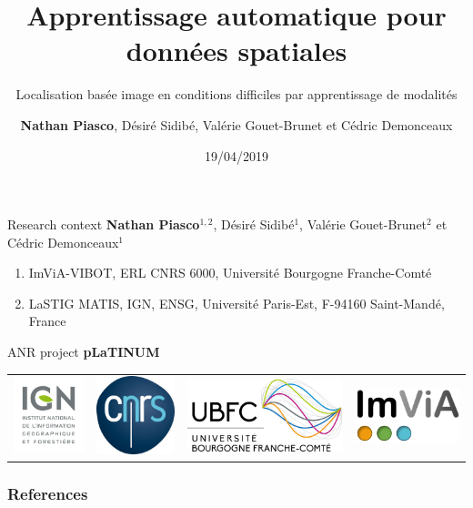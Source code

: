 \documentclass[9pt]{beamer}
\title{Apprentissage automatique pour données spatiales}
\subtitle{Localisation basée image en conditions difficiles par apprentissage de modalités}
\author{\textbf{Nathan Piasco}, Désiré Sidibé, Valérie Gouet-Brunet et Cédric Demonceaux}
\institute{$28^{iemes}$ Journées de la Recherche} %
\date{19/04/2019}
\begin{document}
\begin{frame}[plain,c]
	\titlepage
\end{frame}

\begin{frame}{Research context}
	\textbf{Nathan Piasco}$^{1, 2}$, Désiré Sidibé$^1$, Valérie Gouet-Brunet$^2$ et Cédric Demonceaux$^1$
	\vfill	
	
	\begin{enumerate}
		\item ImViA-VIBOT, 	ERL CNRS  6000,  Universit\'e  Bourgogne Franche-Comt\'e
		\item LaSTIG MATIS, IGN, ENSG, Universit\'e Paris-Est, 	F-94160 Saint-Mand\'e, France
	\end{enumerate}
	\vfill
		
	ANR project \textbf{pLaTINUM}
	\vfill
	
	\begin{tabular}{c c c c}
		\includegraphics[width=0.15\linewidth]{images/logos/ign_logo} & 
			\includegraphics[width=0.15\linewidth]{images/logos/cnrs} &
					\includegraphics[width=0.27\linewidth]{images/logos/ubfc} &
							\includegraphics[width=0.25\linewidth]{images/logos/imvia} \\
	\end{tabular}
\end{frame}





%
%
%

\begin{frame}
\frametitle{References}


\scriptsize{}

\end{frame}

\appendix
\end{document}
